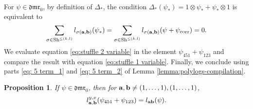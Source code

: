 \documentclass[a4paper,fleqn]{cas-sc}
\newtheorem{proposition}[theorem]{Proposition}
\begin{document}
\begin{pf}
	For $\psi\in \mathfrak{dmr}_0$, by definition of $\Delta_{*}$, the condition $\Delta_{*}(\psi_{*})=1\otimes \psi_{*}+\psi_{*}\otimes 1$ is equivalent to 
	\begin{equation}\label{eq:stuffle 1 variable}
		\sum_{\sigma\in \text{Sh}^{\le(k,l)}}	l_{\sigma(\bf{a},\bf{b})}(\psi_*)=\sum_{\sigma\in \text{Sh}^{\le(k,l)}}	l_{\sigma(\bf{a},\bf{b})}(\psi+\psi_{\text{corr}})=0.
	\end{equation}
%
	We evaluate equation \eqref{eq:stuffle 2 variable} in the element $\psi_{451}+\psi_{123}$ and compare the result with equation \eqref{eq:stuffle 1 variable}. Finally, we conclude using parts \eqref{eq: 5 term_1} and \eqref{eq: 5 term_2} of Lemma \ref{lemma:polylogs-compilation}. 
%
	
\end{pf}


\begin{proposition}\label{prop:admissible}
	If $\psi \in \mathfrak{dmr}_0$, then for ${\bf{a},\bf{b}}\ne (1,\dots,1),(1,\dots,1)$,
	\begin{equation}\label{eq:2 to 1}
		l^{y,x}_{\bf{a},\bf{b}}(\psi_{451}+\psi_{123})=l_{\bf{ab}}(\psi).
	\end{equation}
\end{proposition}
\end{document}
